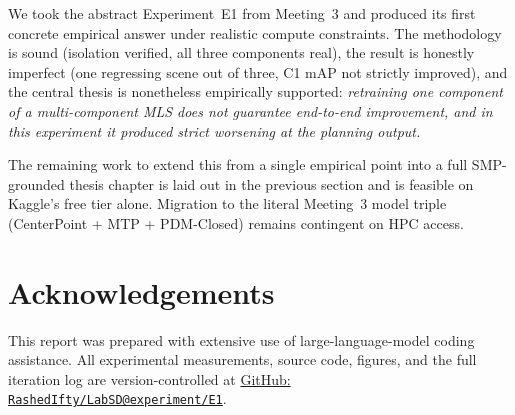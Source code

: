 \documentclass[11pt,a4paper]{article}
\begin{document}
We took the abstract Experiment~E1 from Meeting~3 and produced its
first concrete empirical answer under realistic compute constraints.
The methodology is sound (isolation verified, all three components
real), the result is honestly imperfect (one regressing scene out of
three, C1 mAP not strictly improved), and the central thesis is
nonetheless empirically supported: \emph{retraining one component of
a multi-component MLS does not guarantee end-to-end improvement, and
in this experiment it produced strict worsening at the planning
output.}

The remaining work to extend this from a single empirical point into
a full SMP-grounded thesis chapter is laid out in the previous
section and is feasible on Kaggle's free tier alone. Migration to the
literal Meeting~3 model triple (CenterPoint + MTP + PDM-Closed)
remains contingent on HPC access.

\section*{Acknowledgements}

This report was prepared with extensive use of large-language-model
coding assistance. All experimental measurements, source code,
figures, and the full iteration log are version-controlled at
\href{https://github.com/RashedIfty/LabSD/tree/experiment/E1}{GitHub:
\texttt{RashedIfty/LabSD@experiment/E1}}.
\end{document}
